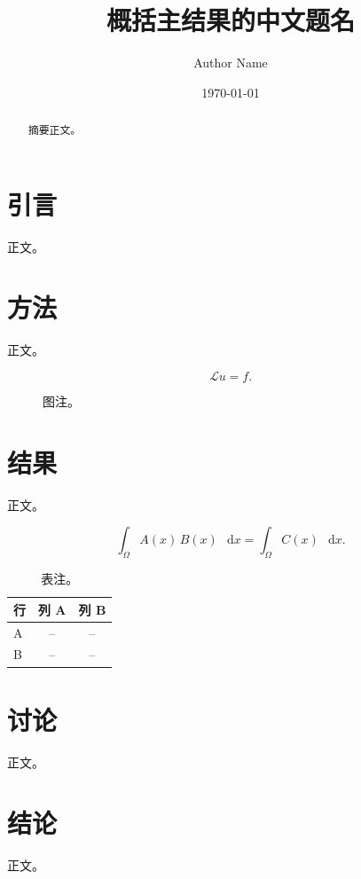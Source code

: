 \documentclass[UTF8,a4paper,10pt,twocolumn,fontset=fandol]{ctexart}
\title{概括主结果的中文题名}
\author{Author Name}
\date{\today}
\providecommand{\dd}{\mathop{}\!\mathrm{d}}
\theoremstyle{definition}
\theoremstyle{remark}
\begin{document}
\maketitle

\begin{abstract}
摘要正文。
\end{abstract}

\section{引言}

正文。

\section{方法}

正文。

\begin{equation}
  \mathcal{L}u = f .
  \label{eq:example-zh}
\end{equation}

\begin{figure}[t]
  \centering
  \fbox{\rule{0pt}{1.35in}\rule{0.90\columnwidth}{0pt}}
  \caption{图注。\label{fig:example-zh}}
\end{figure}

\section{结果}

正文。

\begin{equation}
  \int_{\Omega} A(x)\,B(x)\,\dd x
  =
  \int_{\Omega} C(x)\,\dd x .
  \label{eq:wide-example-zh}
\end{equation}

\begin{table}[b]
  \caption{表注。\label{tab:example-zh}}
  \begin{tabular}{lcc}
  \toprule
  行 & 列 A & 列 B \\
  \midrule
  A & -- & -- \\
  B & -- & -- \\
  \bottomrule
  \end{tabular}
\end{table}

\section{讨论}

正文。

\section{结论}

正文。

\end{document}
